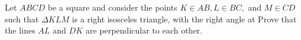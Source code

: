 Let $ABCD$ be a square and consider the points $K\in AB, L\in BC,$ and $M\in CD$ such that $\Delta KLM$ is a right isosceles triangle, with the right angle at  Prove that the lines $AL$ and $DK$ are perpendicular to each other.